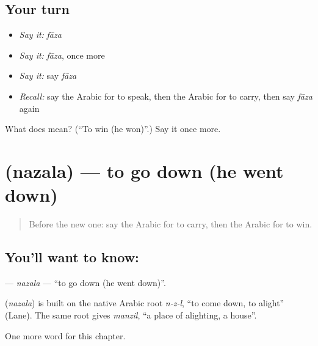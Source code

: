\subsection*{Your turn}
\begin{itemize}
\raggedright
  \item \emph{Say it:} \emph{fāza}
  \item \emph{Say it:} \emph{fāza}, once more
  \item \emph{Say it:} say \emph{fāza}
  \item \emph{Recall:} say the Arabic for to speak, then the Arabic for to carry, then say \emph{fāza} again
\end{itemize}

\begin{tcolorbox}[breakable,colback=teal!4,colframe=teal!35!black,title={Before you move on}]
What does  mean? (\textquotedblleft{}To win (he won)\textquotedblright{}.) Say it once more.
\end{tcolorbox}
\section[\texorpdfstring{\ar{نزل} (nazala)}{نزل (nazala)}]{ (nazala) — to go down (he went down)}

\label{lesson:AR-C65-nazala}



\begin{quote}
Before the new one: say the Arabic for to carry, then the Arabic for to win.
\end{quote}

\subsection*{You'll want to know: }
\textbf{} — \emph{nazala} — \textquotedblleft{}to go down (he went down)\textquotedblright{}.

\begin{cousinweb}
\textbf{} (\emph{nazala}) is built on the native Arabic root \emph{n-z-l}, \textquotedblleft{}to come down, to alight\textquotedblright{} (Lane). The same root gives \emph{manzil}, \textquotedblleft{}a place of alighting, a house\textquotedblright{}.
\end{cousinweb}

\begin{grammarlens}[title={What you've built}]
One more word for this chapter.
\end{grammarlens}

